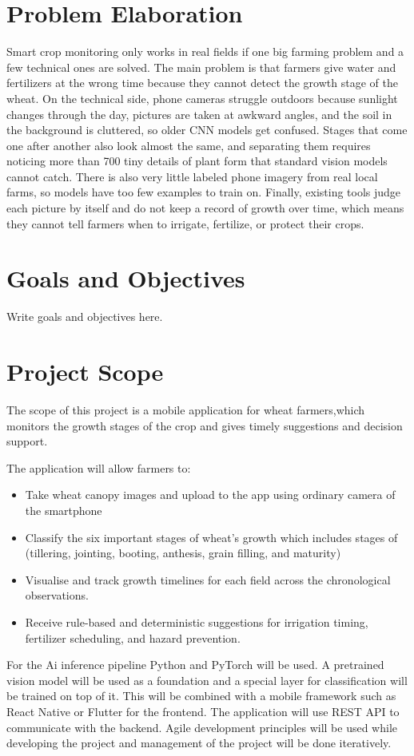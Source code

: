 \documentclass{FastFyp}
\begin{document}
\section{Problem Elaboration}
Smart crop monitoring only works in real fields if one big farming problem and a few technical ones are solved. The main problem is that farmers give water and fertilizers at the wrong time because they cannot detect the growth stage of the wheat. On the technical side, phone cameras struggle outdoors because sunlight changes through the day, pictures are taken at awkward angles, and the soil in the background is cluttered, so older CNN models get confused. Stages that come one after another also look almost the same, and separating them requires noticing more than 700 tiny details of plant form that standard vision models cannot catch. There is also very little labeled phone imagery from real local farms, so models have too few examples to train on. Finally, existing tools judge each picture by itself and do not keep a record of growth over time, which means they cannot tell farmers when to irrigate, fertilize, or protect their crops. 
\section{Goals and Objectives}
Write goals and objectives here.
\section{Project Scope}
The scope of this project is a mobile application for wheat farmers,which monitors the growth stages of the crop and gives timely suggestions and decision support. 

The application will allow farmers to:
\begin{itemize}
    \item Take wheat canopy images and upload to the app using ordinary camera of the smartphone
    \item Classify the six important stages of wheat's growth which includes stages of (tillering, jointing, booting, anthesis, grain filling, and maturity)
    \item Visualise and track growth timelines for each field across the chronological observations.
    \item Receive rule-based and deterministic suggestions for irrigation timing, fertilizer scheduling, and hazard prevention.
\end{itemize}
 For the Ai inference pipeline Python and PyTorch will be used. A pretrained vision model will be used as a foundation and a special layer for classification will be trained on top of it. This will be combined with a mobile framework such as React Native or Flutter for the frontend. The application will use REST API to communicate with the backend. Agile development principles will be used while developing the project and management of the project will be done iteratively.
 
\end{document}
